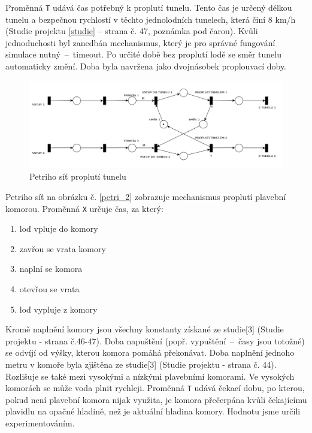 \documentclass[11pt,a4paper]{article}
\begin{document}
      Proměnná \texttt{T} udává čas potřebný k proplutí tunelu.
      Tento čas je určený délkou tunelu a bezpečnou
      rychlostí v těchto jednolodních tunelech, která činí
      8 km/h (Studie projektu \ref{studie} -- strana č. 47, poznámka pod čarou).
      Kvůli jednoduchosti byl zanedbán mechanismus, který je pro správné
      fungování simulace nutný \,--\, timeout. Po určité době bez proplutí lodě
      se směr tunelu automaticky změní. Doba byla navržena jako dvojnásobek
      proplouvací doby.

      \begin{figure}[H]
        \centering
        \includegraphics[width=1\textwidth, natwidth=940, natheight=325]
                        {petri_net_1.png}
        \caption{Petriho síť proplutí tunelu} \label{petri_1}
      \end{figure}

      \break

      Petriho síť na obrázku č. \ref{petri_2} zobrazuje mechanismus proplutí
      plavební komorou. Proměnná \texttt{X} určuje čas, za který:

      \begin{enumerate}
        \item loď vpluje do komory
        \item zavřou se vrata komory
        \item naplní se komora
        \item otevřou se vrata
        \item loď vypluje z komory
      \end{enumerate}

      Kromě naplnění komory jsou všechny konstanty získané ze
      studie[3] (Studie projektu - strana č.46-47).
      Doba napuštění (popř. vypuštění \,--\, časy jsou totožné) se odvíjí od
      výšky, kterou komora pomáhá překonávat. Doba naplnění jednoho metru v
      komoře byla zjištěna ze studie[3] (Studie projektu - strana č. 44).
      Rozlišuje se také mezi vysokými a nízkými plavebními komorami.
      Ve vysokých komorách se může voda plnit rychleji.
      Proměnná \texttt{T} udává čekací dobu, po kterou, pokud není plavební
      komora nijak využita, je komora přečerpána kvůli čekajícímu plavidlu na
      opačné hladině, než je aktuální hladina komory. Hodnotu jsme určili
      experimentováním.
\end{document}
